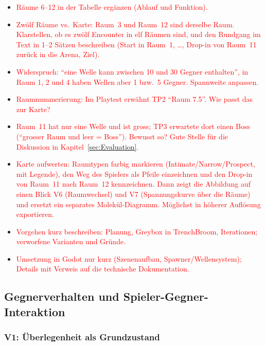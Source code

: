 \documentclass[../Main.tex]{subfiles}
\begin{document}
\begin{itemize}[leftmargin=1.5cm]
    \item \textcolor{red}{Räume 6--12 in der Tabelle ergänzen (Ablauf und Funktion).}
    \item \textcolor{red}{Zwölf Räume vs.\ Karte: Raum~3 und Raum~12 sind derselbe Raum. Klarstellen, ob es zwölf Encounter in elf Räumen sind, und den Rundgang im Text in 1--2 Sätzen beschreiben (Start in Raum~1, \ldots, Drop-in von Raum~11 zurück in die Arena, Ziel).}
    \item \textcolor{red}{Widerspruch: \enquote{eine Welle kann zwischen 10 und 30 Gegner enthalten}, in Raum 1, 2 und 4 haben Wellen aber 1 bzw.\ 5 Gegner. Spannweite anpassen.}
    \item \textcolor{red}{Raumnummerierung: Im Playtest erwähnt TP2 \enquote{Raum 7.5}. Wie passt das zur Karte?}
    \item \textcolor{red}{Raum~11 hat nur eine Welle und ist gross; TP3 erwartete dort einen Boss (\enquote{grosser Raum und leer = Boss}). Bewusst so? Gute Stelle für die Diskussion in Kapitel~\ref{sec:Evaluation}.}
    \item \textcolor{red}{Karte aufwerten: Raumtypen farbig markieren (Intimate/Narrow/Prospect, mit Legende), den Weg des Spielers als Pfeile einzeichnen und den Drop-in von Raum~11 nach Raum~12 kennzeichnen. Dann zeigt die Abbildung auf einen Blick V6 (Raumwechsel) und V7 (Spannungskurve über die Räume) und ersetzt ein separates Molekül-Diagramm. Möglichst in höherer Auflösung exportieren.}
    \item \textcolor{red}{Vorgehen kurz beschreiben: Planung, Greybox in TrenchBroom, Iterationen; verworfene Varianten und Gründe.}
    \item \textcolor{red}{Umsetzung in Godot nur kurz (Szenenaufbau, Spawner/Wellensystem); Details mit Verweis auf die technische Dokumentation.}
\end{itemize}

\subsection{Gegnerverhalten und Spieler-Gegner-Interaktion} \label{sec:UmsetzungGegner}

\subsubsection{V1: Überlegenheit als Grundzustand} \label{sec:V1}
\end{document}

